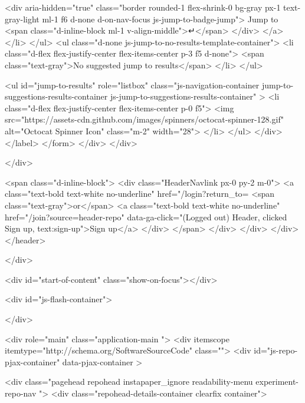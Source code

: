                     <div aria-hidden="true" class="border rounded-1 flex-shrink-0 bg-gray px-1 text-gray-light ml-1 f6 d-none d-on-nav-focus js-jump-to-badge-jump">
                      Jump to
                      <span class="d-inline-block ml-1 v-align-middle">↵</span>
                    </div>
                  </a>
                </li>
              </ul>
              <ul class="d-none js-jump-to-no-results-template-container">
                <li class="d-flex flex-justify-center flex-items-center p-3 f5 d-none">
                  <span class="text-gray">No suggested jump to results</span>
                </li>
              </ul>

              <ul id="jump-to-results" role="listbox" class="js-navigation-container jump-to-suggestions-results-container js-jump-to-suggestions-results-container" >
                <li class="d-flex flex-justify-center flex-items-center p-0 f5">
                  <img src="https://assets-cdn.github.com/images/spinners/octocat-spinner-128.gif" alt="Octocat Spinner Icon" class="m-2" width="28">
                </li>
              </ul>
            </div>
      </label>
</form>  </div>
</div>

          </div>

        <span class="d-inline-block">
            <div class="HeaderNavlink px-0 py-2 m-0">
              <a class="text-bold text-white no-underline" href="/login?return_to=%
                <span class="text-gray">or</span>
                <a class="text-bold text-white no-underline" href="/join?source=header-repo" data-ga-click="(Logged out) Header, clicked Sign up, text:sign-up">Sign up</a>
            </div>
        </span>
      </div>
    </div>
  </div>
</header>

  </div>

  <div id="start-of-content" class="show-on-focus"></div>

    <div id="js-flash-container">


</div>



  <div role="main" class="application-main ">
        <div itemscope itemtype="http://schema.org/SoftwareSourceCode" class="">
    <div id="js-repo-pjax-container" data-pjax-container >
      





  <div class="pagehead repohead instapaper_ignore readability-menu experiment-repo-nav  ">
    <div class="repohead-details-container clearfix container">


